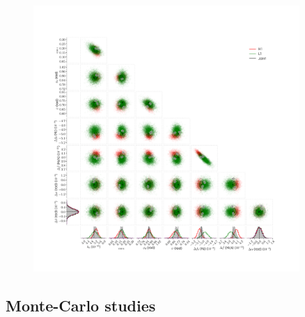 \begin{figure}[!phtb]
\begin{center}
\includegraphics[width=0.9\textwidth]{./figures/codeeval/simulations/S6_swinj/s6sw_inj}
\caption{ \protect}
\end{center}
\end{figure}

\subsection{Monte-Carlo studies}

